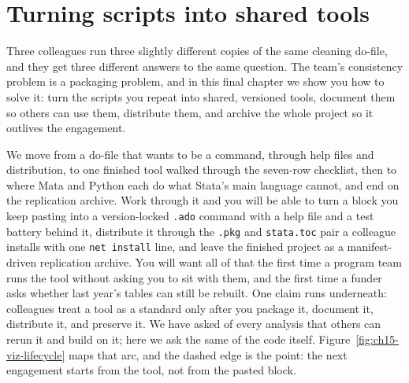 \documentclass[
    a4paper,
    fontsize=10pt,
    twoside=true,
    numbers=noenddot,
]{kaobook}
\begin{document}
\chapter{Turning scripts into shared tools}\label{ch:tools}

Three colleagues run three slightly different copies of the same cleaning do-file, and they get three different answers to the same question. The team's consistency problem is a packaging problem, and in this final chapter we show you how to solve it: turn the scripts you repeat into shared, versioned tools, document them so others can use them, distribute them, and archive the whole project so it outlives the engagement.

We move from a do-file that wants to be a command, through help files and distribution, to one finished tool walked through the seven-row checklist, then to where Mata and Python each do what Stata's main language cannot, and end on the replication archive. Work through it and you will be able to turn a block you keep pasting into a version-locked \texttt{.ado} command with a help file and a test battery behind it, distribute it through the \texttt{.pkg} and \texttt{stata.toc} pair a colleague installs with one \texttt{net install} line, and leave the finished project as a manifest-driven replication archive. You will want all of that the first time a program team runs the tool without asking you to sit with them, and the first time a funder asks whether last year's tables can still be rebuilt. One claim runs underneath: colleagues treat a tool as a standard only after you package it, document it, distribute it, and preserve it. We have asked of every analysis that others can rerun it and build on it; here we ask the same of the code itself. Figure~\ref{fig:ch15-viz-lifecycle} maps that arc, and the dashed edge is the point: the next engagement starts from the tool, not from the pasted block.
\end{document}
